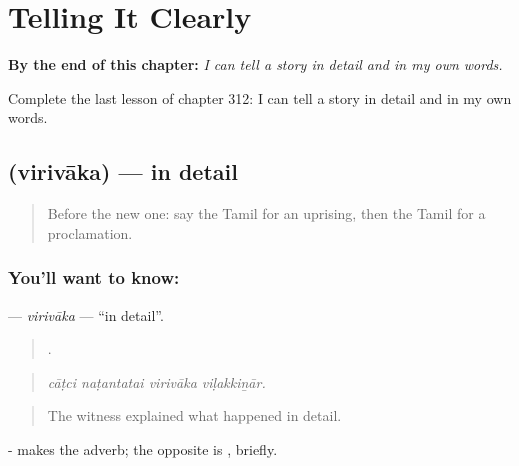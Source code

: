 
\chapter{Telling It Clearly}
\label{ch:ta-telling-it-clearly}

\begin{chapteropening}
\textbf{By the end of this chapter:} \emph{I can tell a story in detail and in my own words.}

Complete the last lesson of chapter 312: I can tell a story in detail and in my own words.
\end{chapteropening}

\section[\texorpdfstring{\ta{விரிவாக} (virivāka)}{விரிவாக (virivāka)}]{ (virivāka) — in detail}

\label{lesson:TA-C312-virivaka}



\begin{quote}
Before the new one: say the Tamil for an uprising, then the Tamil for a proclamation.
\end{quote}

\subsection*{You'll want to know: }
\textbf{} — \emph{virivāka} — \textquotedblleft{}in detail\textquotedblright{}.

\begin{quote}
   .
\end{quote}

\begin{quote}
\emph{cāṭci naṭantatai virivāka viḷakkiṉār.}
\end{quote}

\begin{quote}
The witness explained what happened in detail.
\end{quote}

- makes the adverb; the opposite is , briefly.

